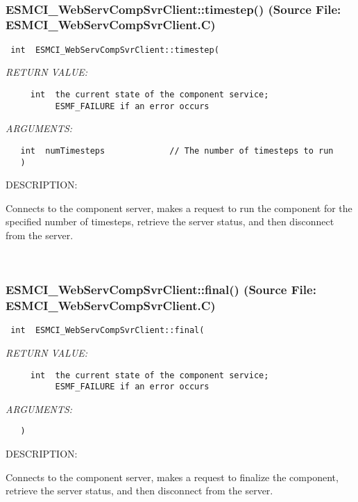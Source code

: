 \mbox{}\hrulefill\
 
\subsubsection{ESMCI\_WebServCompSvrClient::timestep() (Source File: ESMCI\_WebServCompSvrClient.C)}


  
\begin{verbatim} int  ESMCI_WebServCompSvrClient::timestep(\end{verbatim}{\em RETURN VALUE:}
\begin{verbatim}     int  the current state of the component service;
          ESMF_FAILURE if an error occurs\end{verbatim}{\em ARGUMENTS:}
\begin{verbatim}   int  numTimesteps             // The number of timesteps to run
   )\end{verbatim}
{\sf DESCRIPTION:\\ }


      Connects to the component server, makes a request to run the
      component for the specified number of timesteps, retrieve the server
      status, and then disconnect from the server.
   
 
\mbox{}\hrulefill\
 
\subsubsection{ESMCI\_WebServCompSvrClient::final() (Source File: ESMCI\_WebServCompSvrClient.C)}


  
\begin{verbatim} int  ESMCI_WebServCompSvrClient::final(\end{verbatim}{\em RETURN VALUE:}
\begin{verbatim}     int  the current state of the component service;
          ESMF_FAILURE if an error occurs\end{verbatim}{\em ARGUMENTS:}
\begin{verbatim}   )\end{verbatim}
{\sf DESCRIPTION:\\ }


      Connects to the component server, makes a request to finalize the
      component, retrieve the server status, and then disconnect from
      the server.
   
